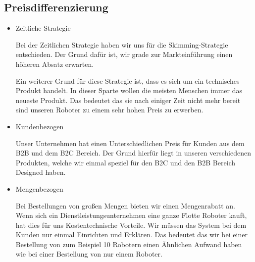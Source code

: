 \subsection{Preisdifferenzierung} \label{Preisdiff}
    \begin{itemize}
        \item Zeitliche Strategie
            
        Bei der Zeitlichen Strategie haben wir uns für die Skimming-Strategie entschieden. Der Grund dafür ist, 
        wir grade zur Markteinführung einen höheren Absatz erwarten. 

        Ein weiterer Grund für diese Strategie ist, dass es sich um ein technisches Produkt handelt. In dieser
        Sparte wollen die meisten Menschen immer das neueste Produkt. Das bedeutet das sie nach einiger Zeit 
        nicht mehr bereit sind unseren Roboter zu einem sehr hohen Preis zu erwerben.

        \item Kundenbezogen

            Unser Unternehmen hat einen Unterschiedlichen Preis für Kunden aus dem B2B und dem B2C Bereich. Der Grund 
            hierfür liegt in unseren verschiedenen Produkten, welche wir einmal speziel für den B2C und den B2B Bereich
            Designed haben.

        \item Mengenbezogen
        
            Bei Bestellungen von großen Mengen bieten wir einen Mengenrabatt an. Wenn sich ein 
            Dienstleistungsunternehmen eine ganze Flotte Roboter kauft, hat dies für uns Kostentechnische Vorteile.
            Wir müssen das System bei dem Kunden nur einmal Einrichten und Erklären. Das bedeutet das wir bei einer 
            Bestellung von zum Beispiel 10 Robotern einen Ähnlichen Aufwand haben wie bei einer Bestellung von nur einem 
            Roboter.
        \end{itemize}
